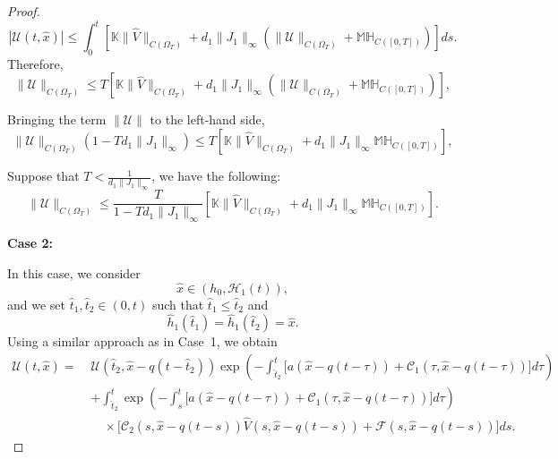\documentclass[a4paper,11pt]{amsart}
\theoremstyle{definition}
\numberwithin{equation}{section}
\theoremstyle{definition}
\begin{document}
\begin{proof}
\begin{equation*}
|\mathcal{U}(t, \hat{x})| \leq \int_0^t \left[ \mathbb{K} \|\hat{V}\|_{C(\Omega_T)} + d_1 \|J_1\|_\infty \left( \|\mathcal{U}\|_{C(\Omega_T)} + \mathbb{M} \mathbb{H}_{C([0,T])} \right) \right] ds.
\end{equation*}
Therefore,
\begin{equation*}\label{eq:u_bound}
\|\mathcal{U}\|_{C(\Omega_T)} \leq T \left[ \mathbb{K} \|\hat{V}\|_{C(\Omega_T)} + d_1 \|J_1\|_\infty \left( \|\mathcal{U}\|_{C(\Omega_T)} + \mathbb{M} \mathbb{H}_{C([0,T])} \right) \right],
\end{equation*}

Bringing the term \(\|\mathcal{U}\|\) to the left-hand side,
\begin{equation}
\|\mathcal{U}\|_{C(\Omega_T)} \left( 1 - T d_1 \|J_1\|_\infty \right)
\leq T \left[ \mathbb{K} \|\hat{V}\|_{C(\Omega_T)} + d_1 \|J_1\|_\infty \mathbb{M} \mathbb{H}_{C([0,T])} \right],
\end{equation}

Suppose that \( T < \frac{1}{d_1 \|J_1\|_\infty} \), we have the following:
\begin{equation}\label{eq:u_final_estimate}
\|\mathcal{U}\|_{C(\Omega_T)} \leq \frac{T}{1 - T d_1 \|J_1\|_\infty} \left[ \mathbb{K} \|\hat{V}\|_{C(\Omega_T)} + d_1 \|J_1\|_\infty \mathbb{M} \mathbb{H}_{C([0,T])} \right].
\end{equation}

\textbf{Case 2:}

In this case, we consider
\[
\hat{x} \in (h_0, \mathcal{H}_1(t)),
\]
and we set $\hat{t}_1, \hat{t}_2 \in (0, t)$ such that
$\hat{t}_1 \leq \hat{t}_2$ and
\[
\hat{h}_1(\hat{t}_1) = \hat{h}_1(\hat{t}_2) = \hat{x}.
\]
Using a similar approach as in Case~1, we obtain
\begin{equation}\label{eq:U_solution_final}
\begin{aligned}
\mathcal{U}(t, \hat{x}) =\; & \mathcal{U}(\hat{t}_2, \hat{x} - q(t - \hat{t}_2))
\exp\!\left( -\int_{\hat{t}_2}^t \Big[ a(\hat{x} - q(t - \tau)) + \mathcal{C}_1(\tau, \hat{x} - q(t - \tau)) \Big] d\tau \right) \\
& + \int_{\hat{t}_2}^t
\exp\!\left( -\int_s^t \Big[ a(\hat{x} - q(t - \tau)) + \mathcal{C}_1(\tau, \hat{x} - q(t - \tau)) \Big] d\tau \right) \\
& \quad \times \Big[ \mathcal{C}_2(s, \hat{x} - q(t - s)) \hat{V}(s, \hat{x} - q(t - s))
+ \mathcal{F}(s, \hat{x} - q(t - s)) \Big] ds.
\end{aligned}
\end{equation}


\end{proof}
\end{document}
